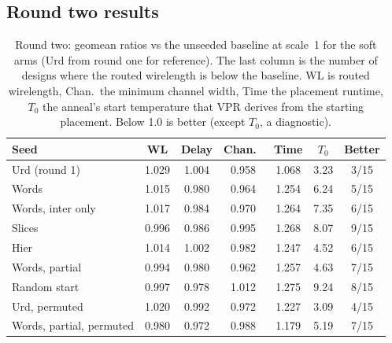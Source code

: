 \subsection{Round two results}
\label{sec:r2-results}

\begin{table}[t]
\caption{Round two: geomean ratios vs the unseeded baseline at scale~1 for the soft arms (Urd from
round one for reference). The last column is the number of designs where the routed wirelength is
below the baseline. WL is routed wirelength, Chan.\ the minimum channel width, Time the
placement runtime, $T_0$ the anneal's start temperature that VPR derives from the
starting placement. Below 1.0 is better (except $T_0$, a diagnostic).}
\label{tab:r2qor}
\centering
\footnotesize\setlength{\tabcolsep}{3pt}
\begin{tabular}{lcccccc}
\toprule
Seed & WL & Delay & Chan.\ & Time & $T_0$ & Better \\
\midrule
Urd (round 1) & 1.029 & 1.004 & 0.958 & 1.068 & 3.23 & 3/15 \\
Words & 1.015 & 0.980 & 0.964 & 1.254 & 6.24 & 5/15 \\
Words, inter only & 1.017 & 0.984 & 0.970 & 1.264 & 7.35 & 6/15 \\
Slices & 0.996 & 0.986 & 0.995 & 1.268 & 8.07 & 9/15 \\
Hier & 1.014 & 1.002 & 0.982 & 1.247 & 4.52 & 6/15 \\
Words, partial & 0.994 & 0.980 & 0.962 & 1.257 & 4.63 & 7/15 \\
Random start & 0.997 & 0.978 & 1.012 & 1.275 & 9.24 & 8/15 \\
Urd, permuted & 1.020 & 0.992 & 0.972 & 1.227 & 3.09 & 4/15 \\
Words, partial, permuted & 0.980 & 0.972 & 0.988 & 1.179 & 5.19 & 7/15 \\
\bottomrule
\end{tabular}
\end{table}

